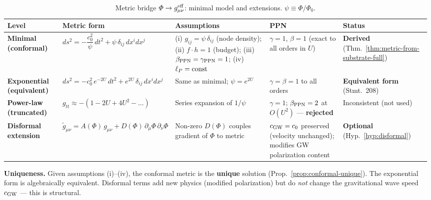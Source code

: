 
\begin{table}[htbp]
\centering
\caption{Metric bridge $\Phi \to g^{\rm eff}_{\mu\nu}$: minimal model and extensions.
  $\psi \equiv \Phi/\Phi_0$.}
\label{tab:metric-bridge}
\small
\begin{tabular}{@{}llllp{3.5cm}@{}}
\toprule
\textbf{Level} & \textbf{Metric form} & \textbf{Assumptions} & \textbf{PPN} & \textbf{Status} \\
\midrule
%
\textbf{Minimal (conformal)}
  & $ds^2 = -\dfrac{c_0^2}{\psi}\,dt^2 + \psi\,\delta_{ij}\,dx^i dx^j$
  & (i) $g_{ij} = \psi\,\delta_{ij}$ (node density); \newline
    (ii) $f\!\cdot\!h = 1$ (budget); \newline
    (iii) $\beta_{\rm PPN} = \gamma_{\rm PPN} = 1$; \newline
    (iv) $\ell_P = {\rm const}$
  & $\gamma = 1$, $\beta = 1$ (exact to all orders in $U$)
  & \textbf{Derived} (Thm.~\ref{thm:metric-from-substrate-full}) \\[12pt]
%
\textbf{Exponential (equivalent)}
  & $ds^2 = -c_0^2\,e^{-2U}\,dt^2 + e^{2U}\,\delta_{ij}\,dx^i dx^j$
  & Same as minimal; $\psi = e^{2U}$
  & $\gamma = \beta = 1$ to all orders
  & \textbf{Equivalent form} (Stmt.~208) \\[8pt]
%
\textbf{Power-law (truncated)}
  & $g_{tt} \approx -(1 - 2U + 4U^2 - \ldots)$
  & Series expansion of $1/\psi$
  & $\gamma = 1$; $\beta_{\rm PPN} = 2$ at $O(U^2)$ --- \textbf{rejected}
  & Inconsistent (not used) \\[8pt]
%
\textbf{Disformal extension}
  & $\tilde{g}_{\mu\nu} = A(\Phi)\,g_{\mu\nu} + D(\Phi)\,\partial_\mu\Phi\,\partial_\nu\Phi$
  & Non-zero $D(\Phi)$ couples gradient of $\Phi$ to metric
  & $c_{\rm GW} = c_0$ preserved (velocity unchanged); modifies GW polarization content
  & \textbf{Optional} (Hyp.~\ref{hyp:disformal}) \\
\bottomrule
\end{tabular}

\medskip
\noindent\textbf{Uniqueness.}
Given assumptions (i)--(iv), the conformal metric is the \textbf{unique} solution
(Prop.~\ref{prop:conformal-unique}).  The exponential form is algebraically equivalent.
Disformal terms add new physics (modified polarization) but do \emph{not} change
the gravitational wave speed $c_{\rm GW}$ --- this is structural.


\end{table}
